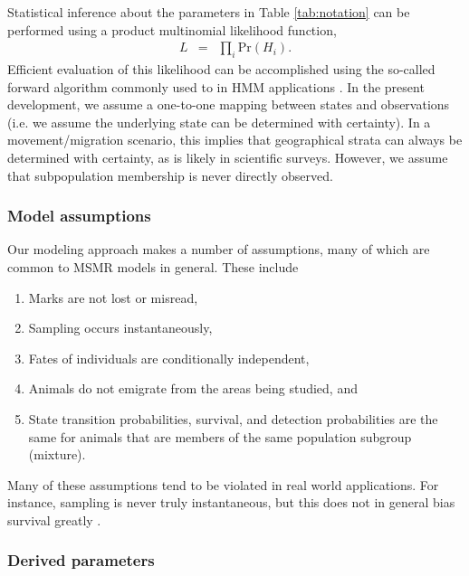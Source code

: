 \documentclass[times,mee,doublespace,]{besauth2}
\begin{document}
Statistical inference about the parameters in Table \ref{tab:notation} can be performed using a product multinomial likelihood function,
\begin{eqnarray*}
  L & = & \prod_i \textrm{Pr}(H_i).
\end{eqnarray*}
Efficient evaluation of this likelihood can be accomplished using the so-called forward algorithm commonly used to in HMM applications \citep{ZucchiniMacDonald2009,Laake2013}.  In the present development, we assume a one-to-one mapping between states and observations (i.e. we assume the underlying state can be determined with certainty). In a movement/migration scenario, this implies that geographical strata can always be determined with certainty, as is likely in scientific surveys. However, we assume that subpopulation membership is never directly observed.

\subsubsection{Model assumptions}

Our modeling approach makes a number of assumptions, many of which are common to MSMR models in general.  These include
\begin{enumerate}
  \item Marks are not lost or misread,
  \item Sampling occurs instantaneously,
  \item Fates of individuals are conditionally independent,
  \item Animals do not emigrate from the areas being studied, and
  \item State transition probabilities, survival, and detection probabilities are the same for animals that are members of the same population subgroup (mixture).
\end{enumerate}
Many of these assumptions tend to be violated in real world applications.  For instance, sampling is never truly instantaneous, but this does not in general bias survival greatly \citep{OBrienEtAl2005}.

\subsubsection{Derived parameters}
\end{document}
